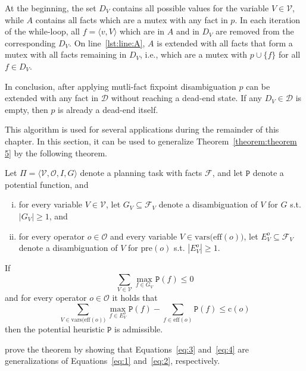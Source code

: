 At the beginning, the set $D_V$ contains all possible values for the variable $V\in\mathcal{V}$, while $A$ contains all facts which are a mutex with any fact in $p$.
In each iteration of the while-loop, all $f=\langle v, V\rangle$ which are in $A$ and in $D_V$ are removed from the corresponding $D_V$.
On line~\ref{lst:line:A}, $A$ is extended with all facts that form a mutex with all facts remaining in $D_V$, i.e., which are a mutex with $p\cup\{f\}$ for all $f\in D_V$.

In conclusion, after applying mutli-fact fixpoint disambiguation $p$ can be extended with any fact in $\mathcal{D}$ without reaching a dead-end state.
If any $D_V\in\mathcal{D}$ is empty, then $p$ is already a dead-end itself.

This algorithm is used for several applications during the remainder of this chapter.
In this section, it can be used to generalize Theorem~\ref{theorem:theorem 5} by the following theorem.

\begin{theorem}
    \label{theorem:7}
    Let $\Pi = \langle \mathcal{V}, \mathcal{O}, I, G \rangle$ denote a planning task with facts $\mathcal{F}$, and let $\mathtt{P}$ denote a potential function, and
    \begin{enumerate}[(i)]
        \item for every variable $V\in\mathcal{V}$, let $G_V\subseteq\mathcal{F}_V$ denote a disambiguation of $V$ for $G$ s.t. $|G_V|\geq1$, and
        \item for every operator $o\in\mathcal{O}$ and every variable $V\in\mathrm{vars(eff}(o))$, let $E^o_V\subseteq\mathcal{F}_V $ denote a disambiguation of $V$ for $\mathrm{pre}(o)$ s.t. $|E^o_V|\geq1$.
    \end{enumerate}

    If
    \begin{equation}\sum_{V\in\mathcal{V}}\max_{f\in G_V}\mathtt{P}(f)\leq0\label{eq:3}\end{equation}
    and for every operator $o\in\mathcal{O}$ it holds that
    \begin{equation}\sum_{V\in\mathrm{vars(eff}(o))}\max_{f\in E^o_V}\mathtt{P}(f) - \sum_{f\in\mathrm{eff}(o)}\mathtt{P}(f)\leq\mathrm{c}(o)\label{eq:4}\end{equation}
    then the potential heuristic $\mathtt{P}$ is admissible.
\end{theorem}

\citeauthor{fivser2020strengthening} prove the theorem by showing that Equations~\eqref{eq:3} and~\eqref{eq:4} are generalizations of Equations~\eqref{eq:1} and~\eqref{eq:2}, respectively.


